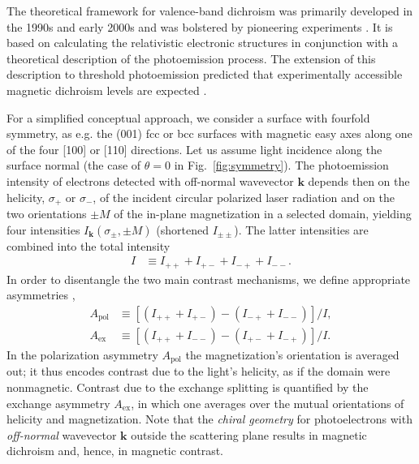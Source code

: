 \documentclass[prl,twocolumn,floatfix,superscriptaddress,aps]{revtex4-2}
\renewcommand{\vec}[1]{\boldsymbol{#1}}
\begin{document}
The theoretical framework for valence-band dichroism was primarily developed in the 1990s and early 2000s \cite{tamura1987, feder1996,henk1996,kuch1996a,feder1998,venus1994,venus1997,kuch2001} and was bolstered by pioneering experiments \cite{venus95, hild2008, hild2009, hild2010}. It is based on calculating the relativistic electronic  structures in conjunction with a theoretical description of the photoemission process. 
The extension of this description to threshold photoemission predicted that experimentally accessible magnetic dichroism levels are expected \cite{feder1998}. 


For a simplified conceptual approach, we consider a surface with fourfold symmetry, as e.g. the (001) fcc or bcc surfaces with magnetic easy axes along one of the four [100] 
or [110] 
directions. Let us assume light incidence along the surface normal (the case of $\theta = 0$ in Fig.~\ref{fig:symmetry}). The photoemission intensity of electrons detected with off-normal wavevector $\vec{k}$ depends then on the helicity, $\sigma_{+}$ or $\sigma_{-}$, of the incident circular polarized laser radiation and on the two orientations $\pm M$ of the in-plane magnetization in a selected domain, yielding four intensities $I_{\vec{k}}(\sigma_{\pm}, \pm M)$ (shortened $I_{\pm \pm}$). The latter intensities are combined into the total intensity
\begin{align}
    I & \equiv I_{+ +} + I_{+ -} + I_{- +} + I_{- -}. 
\end{align}
In order to disentangle the two main contrast mechanisms, we define appropriate asymmetries \cite{henk1998},
\begin{subequations}
\begin{align}
    A_{\mathrm{pol}} & \equiv \left[ \left( I_{+ +} + I_{+ -} \right) - \left( I_{- +} + I_{- -} \right) \right] / I,
    \label{eq:Apol}
    \\
    A_{\mathrm{ex}} & \equiv \left[ \left( I_{+ +} + I_{- -} \right) - \left( I_{+ -} + I_{- +} \right) \right] / I.
    \label{eq:Aex}
\end{align}    
\end{subequations}
In the polarization asymmetry $A_{\mathrm{pol}}$ the magnetization's orientation is averaged out; it thus encodes contrast due to the light's helicity, as if the domain were nonmagnetic. Contrast due to the exchange splitting is quantified by the exchange asymmetry $A_{\mathrm{ex}}$, in which one averages over the mutual orientations of helicity and magnetization. Note that the \emph{chiral geometry} for photoelectrons with \emph{off-normal} wavevector $\vec{k}$ outside the scattering plane results in magnetic dichroism and, hence, in magnetic contrast.
\end{document}
